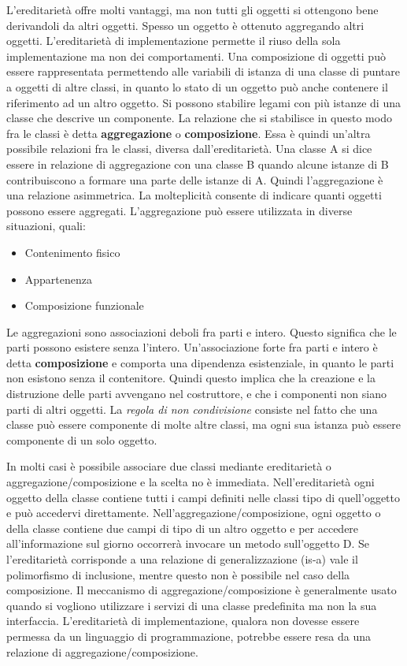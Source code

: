\documentclass[a4paper,18pt]{extarticle}
\begin{document}
L'ereditarietà offre molti vantaggi, ma non tutti gli oggetti si ottengono bene derivandoli da altri oggetti. Spesso un oggetto è ottenuto aggregando altri oggetti. L'ereditarietà di implementazione permette il riuso della sola implementazione ma non dei comportamenti. Una composizione di oggetti può essere rappresentata permettendo alle variabili di istanza di una classe di puntare a oggetti di altre classi, in quanto lo stato di un oggetto può anche contenere il riferimento ad un altro oggetto. Si possono stabilire legami con più istanze di una classe che descrive un componente. La relazione che si stabilisce in questo modo fra le classi è detta \textbf{aggregazione} o \textbf{composizione}. Essa è quindi un'altra possibile relazioni fra le classi, diversa dall'ereditarietà. Una classe A si dice essere in relazione di aggregazione con una classe B quando alcune istanze di B contribuiscono a formare una parte delle istanze di A. Quindi l'aggregazione è una relazione asimmetrica. La molteplicità consente di indicare quanti oggetti possono essere aggregati. L'aggregazione può essere utilizzata in diverse situazioni, quali:
\begin{itemize}
\item Contenimento fisico
\item Appartenenza
\item Composizione funzionale
\end{itemize}

Le aggregazioni sono associazioni deboli fra parti e intero. Questo significa che le parti possono esistere senza l'intero. Un'associazione forte fra parti e intero è detta \textbf{composizione} e comporta una dipendenza esistenziale, in quanto le parti non esistono senza il contenitore. Quindi questo implica che la creazione e la distruzione delle parti avvengano nel costruttore, e che i componenti non siano parti di altri oggetti. La \textit{regola di non condivisione} consiste nel fatto che una classe può essere componente di molte altre classi, ma ogni sua istanza può essere componente di un solo oggetto.

In molti casi è possibile associare due classi mediante ereditarietà o aggregazione/composizione e la scelta no è immediata. Nell'ereditarietà ogni oggetto della classe contiene tutti i campi definiti nelle classi tipo di quell'oggetto e può accedervi direttamente. Nell'aggregazione/composizione, ogni oggetto o della classe contiene due campi di tipo di un altro oggetto e per accedere all'informazione sul giorno occorrerà invocare un metodo sull'oggetto D. Se l'ereditarietà corrisponde a una relazione di generalizzazione (is-a) vale il polimorfismo di inclusione, mentre questo non è possibile nel caso della composizione. Il meccanismo di aggregazione/composizione è generalmente usato quando si vogliono utilizzare i servizi di una classe predefinita ma non la sua interfaccia. L'ereditarietà di implementazione, qualora non dovesse essere permessa da un linguaggio di programmazione, potrebbe essere resa da una relazione di aggregazione/composizione.
\end{document}
